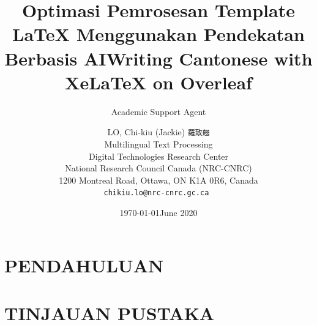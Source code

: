 \documentclass{article}
\title{Optimasi Pemrosesan Template LaTeX Menggunakan Pendekatan Berbasis AI}
\author{Academic Support Agent}
\date{\today}
\begin{document}
\maketitle

\begin{abstract}

\end{abstract}

\chapter{PENDAHULUAN}


\chapter{TINJAUAN PUSTAKA}


\usepackage{hyperref}
\usepackage{natbib}
\usepackage{fontspec}
\usepackage{times}
\usepackage{xeCJK}


\hypersetup{
    colorlinks=true,
    linkcolor=blue,
    urlcolor=blue,
}

\title{Writing Cantonese with XeLaTeX on Overleaf}
\author{LO, Chi-kiu (Jackie) {\tt 羅致翹}\\ Multilingual Text Processing \\ Digital Technologies Research Center \\National Research Council Canada (NRC-CNRC) \\ 1200 Montreal Road, Ottawa, ON K1A 0R6, Canada\\ {\tt chikiu.lo@nrc-cnrc.gc.ca } }
\date{June 2020}
\end{document}
